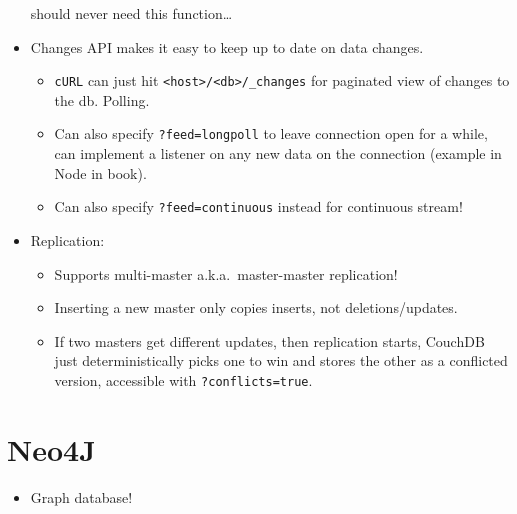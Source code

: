 \documentclass[10pt]{article}
\begin{document}
\begin{itemize}
        should never need this function\dots
    \item Changes API makes it easy to keep up to date on data changes.
        \begin{itemize}
            \item \lstinline{cURL} can just hit \lstinline{<host>/<db>/_changes}
                for paginated view of changes to the db. Polling.
            \item Can also specify \lstinline{?feed=longpoll} to leave
                connection open for a while, can implement a listener on any new
                data on the connection (example in Node in book).
            \item Can also specify \lstinline{?feed=continuous} instead for
                continuous stream!
        \end{itemize}
    \item Replication:
        \begin{itemize}
            \item Supports multi-master a.k.a.\ master-master replication!
            \item Inserting a new master only copies inserts, not
                deletions/updates.
            \item If two masters get different updates, then replication starts,
                CouchDB just deterministically picks one to win and stores the
                other as a conflicted version, accessible with
                \lstinline{?conflicts=true}.
        \end{itemize}
\end{itemize}

\section{Neo4J}

\begin{itemize}
    \item Graph database!
\end{itemize}
\end{document}
